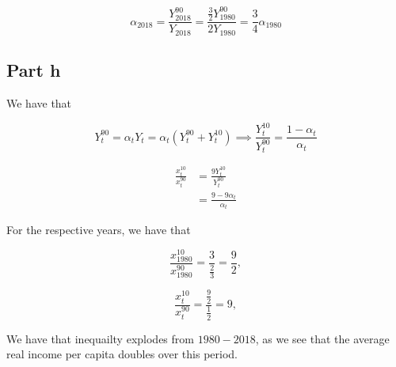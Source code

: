 \documentclass[12pt,letterpaper]{article}
\theoremstyle{definition}
\begin{document}
\[
  \alpha_{2018} = \frac{Y_{2018}^{90}}{Y_{2018}} =
  \frac{\frac{3}{2}Y_{1980}^{90}}{2Y_{1980}} = \frac{3}{4}\alpha_{1980}
\]

\subsection*{Part h}

We have that

\[
  Y_t^{90} = \alpha_tY_t = \alpha_t(Y_t^{90} + Y_t^{10}) \implies
  \frac{Y_t^{10}}{Y_t^{90}} = \frac{1 - \alpha_t}{\alpha_t}
\]

\begin{align*}
  \frac{x_t^{10}}{x_t^{90}} &= \frac{9Y_t^{10}}{Y_t^{90}} \\
                            &= \frac{9 - 9\alpha_t}{\alpha_t}
\end{align*}

For the respective years, we have that

\[
  \frac{x_{1980}^{10}}{x_{1980}^{90}} = \frac{3}{\frac{2}{3}} = \frac{9}{2},
\]

\[
  \frac{x_t^{10}}{x_t^{90}} = \frac{\frac{9}{2}}{\frac{1}{2}} = 9, 
\]

We have that inequailty explodes from $1980 - 2018$, as we see that the average
real income per capita doubles over this period.
\end{document}
